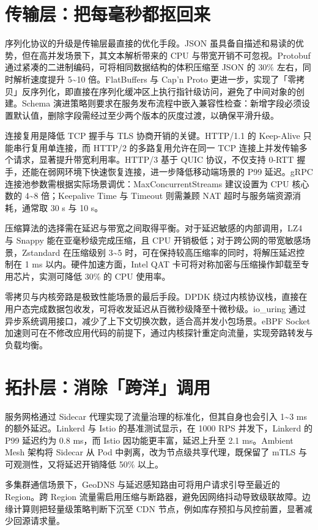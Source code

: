 \chapter{传输层：把每毫秒都抠回来}
序列化协议的升级是传输层最直接的优化手段。JSON 虽具备自描述和易读的优势，但在高并发场景下，其文本解析带来的 CPU 与带宽开销不可忽视。Protobuf 通过紧凑的二进制编码，可将相同数据结构的体积压缩至 JSON 的 30\%{} 左右，同时解析速度提升 5\~{}10 倍。FlatBuffers 与 Cap’n Proto 更进一步，实现了「零拷贝」反序列化，即直接在序列化缓冲区上执行指针级访问，避免了中间对象的创建。Schema 演进策略则要求在服务发布流程中嵌入兼容性检查：新增字段必须设置默认值，删除字段需经过至少两个版本的灰度过渡，以确保平滑升级。\par
连接复用是降低 TCP 握手与 TLS 协商开销的关键。HTTP/1.1 的 Keep-Alive 只能串行复用单连接，而 HTTP/2 的多路复用允许在同一 TCP 连接上并发传输多个请求，显著提升带宽利用率。HTTP/3 基于 QUIC 协议，不仅支持 0-RTT 握手，还能在弱网环境下快速恢复连接，进一步降低移动端场景的 P99 延迟。gRPC 连接池参数需根据实际场景调优：MaxConcurrentStreams 建议设置为 CPU 核心数的 4\~{}8 倍；Keepalive Time 与 Timeout 则需兼顾 NAT 超时与服务端资源消耗，通常取 30 s 与 10 s。\par
压缩算法的选择需在延迟与带宽之间取得平衡。对于延迟敏感的内部调用，LZ4 与 Snappy 能在亚毫秒级完成压缩，且 CPU 开销极低；对于跨公网的带宽敏感场景，Zstandard 在压缩级别 3\~{}5 时，可在保持较高压缩率的同时，将解压延迟控制在 1 ms 以内。硬件加速方面，Intel QAT 卡可将对称加密与压缩操作卸载至专用芯片，实测可降低 30\%{} 的 CPU 使用率。\par
零拷贝与内核旁路是极致性能场景的最后手段。DPDK 绕过内核协议栈，直接在用户态完成数据包收发，可将收发延迟从百微秒级降至十微秒级。io\_{}uring 通过异步系统调用接口，减少了上下文切换次数，适合高并发小包场景。eBPF Socket 加速则可在不修改应用代码的前提下，通过内核探针重定向流量，实现旁路转发与负载均衡。\par
\chapter{拓扑层：消除「跨洋」调用}
服务网格通过 Sidecar 代理实现了流量治理的标准化，但其自身也会引入 1\~{}3 ms 的额外延迟。Linkerd 与 Istio 的基准测试显示，在 1000 RPS 并发下，Linkerd 的 P99 延迟约为 0.8 ms，而 Istio 因功能更丰富，延迟上升至 2.1 ms。Ambient Mesh 架构将 Sidecar 从 Pod 中剥离，改为节点级共享代理，既保留了 mTLS 与可观测性，又将延迟开销降低 50\%{} 以上。\par
多集群通信场景下，GeoDNS 与延迟感知路由可将用户请求引导至最近的 Region。跨 Region 流量需启用压缩与断路器，避免因网络抖动导致级联故障。边缘计算则把轻量级策略判断下沉至 CDN 节点，例如库存预扣与风控前置，显著减少回源请求量。\par
